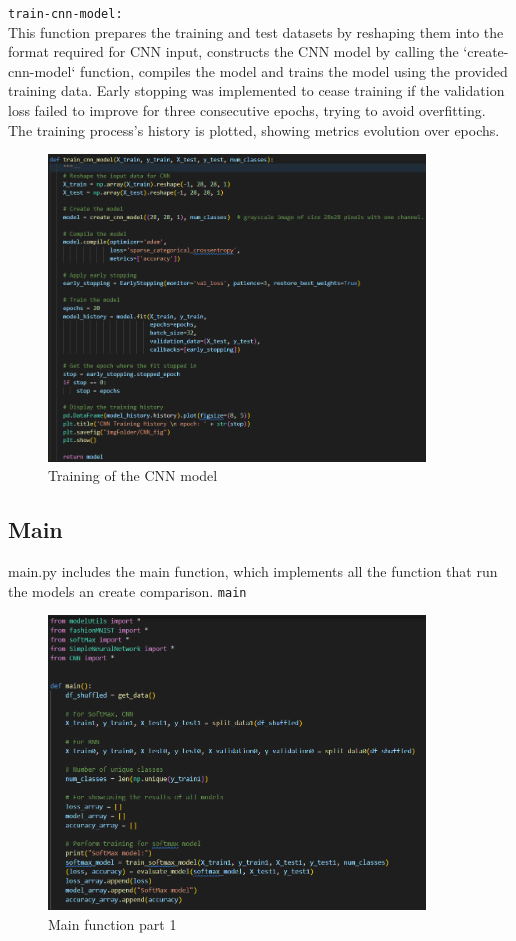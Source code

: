 \documentclass{article}
\newcommand{\code}[1]{\colorbox{light-gray}{\texttt{#1}}}
\begin{document}
\code{train-cnn-model:}\\\newline
This function prepares the training and test datasets by reshaping them into the format
required for CNN input, constructs the CNN model by calling the `create-cnn-model` function,
compiles the model and trains the model using the provided training data.
Early stopping was implemented to cease training if the validation loss failed to improve for three consecutive epochs,
trying to avoid overfitting.
The training process's history is plotted, showing metrics evolution over epochs.
\begin{figure}[H]
    \caption{Training of the CNN model}
    \centering
    \includegraphics[width=10cm]{../imgFolder/train_cnn_model.png}
\end{figure}

\subsection{Main}
main.py includes the main function, which implements all the function that run the models an create comparison.
\code{main}
\begin{figure}[H]
    \caption{Main function part 1}
    \centering
    \includegraphics[width=10cm]{../imgFolder/mainPart1.png}
\end{figure}
\end{document}
